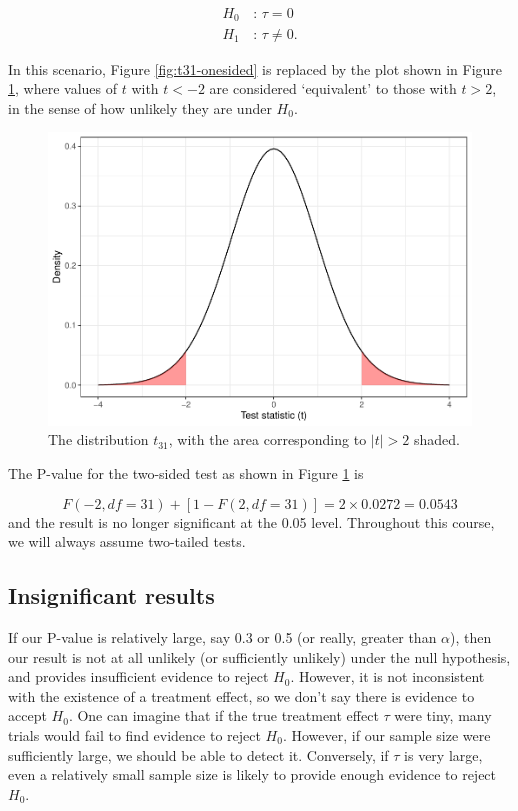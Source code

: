 \documentclass[
  openany]{book}
\theoremstyle{definition}
\theoremstyle{definition}
\theoremstyle{definition}
\theoremstyle{definition}
\theoremstyle{remark}
\begin{document}
\begin{align*}
  H_0\,&:\, \tau=0\\
  H_1\,&:\, \tau\neq 0.
\end{align*}

In this scenario, Figure \ref{fig:t31-onesided} is replaced by the plot shown in Figure \ref{fig:t31-twosided}, where values of \(t\) with \(t<-2\) are considered `equivalent' to those with \(t>2\), in the sense of how unlikely they are under \(H_0\).

\begin{figure}
\centering
\includegraphics{CT4H_notes_files/figure-latex/t31-twosided-1.pdf}
\caption{\label{fig:t31-twosided}The distribution \(t_{31}\), with the area corresponding to \(|t| > 2\) shaded.}
\end{figure}

The P-value for the two-sided test as shown in Figure \ref{fig:t31-twosided} is

\[ F\left(-2, df=31\right) + \left[1 - F\left(2, df=31\right)\right] = 2\times{0.0272} = 0.0543\]
and the result is no longer significant at the 0.05 level. Throughout this course, we will always assume two-tailed tests.

\subsection{Insignificant results}\label{insignificant-results}

If our P-value is relatively large, say 0.3 or 0.5 (or really, greater than \(\alpha\)), then our result is not at all unlikely (or sufficiently unlikely) under the null hypothesis, and provides insufficient evidence to reject \(H_0.\) However, it is not inconsistent with the existence of a treatment effect, so we don't say there is evidence to accept \(H_0\). One can imagine that if the true treatment effect \(\tau\) were tiny, many trials would fail to find evidence to reject \(H_0\). However, if our sample size were sufficiently large, we should be able to detect it. Conversely, if \(\tau\) is very large, even a relatively small sample size is likely to provide enough evidence to reject \(H_0\).
\end{document}
